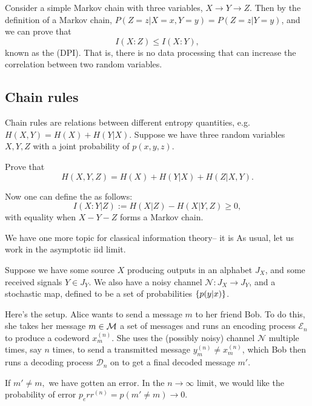 Consider a simple Markov chain with three variables, $X\to Y \to Z$. Then by the definition of a Markov chain, $P(Z=z| X=x, Y=y) = P(Z=z| Y=y)$, and we can prove that
\begin{equation}
    I(X:Z) \leq I(X:Y),
\end{equation}
known as the  (DPI). That is, there is no data processing that can increase the correlation between two random variables.

\subsection*{Chain rules} Chain rules are relations between different entropy quantities, e.g. $H(X,Y)=H(X)+ H(Y|X)$. Suppose we have three random variables $X,Y,Z$ with a joint probability of $p(x,y,z)$.
\begin{ex}
    Prove that
    \begin{equation}
        H(X,Y,Z)=H(X) + H(Y|X) + H(Z|X,Y).
    \end{equation}
\end{ex}
\begin{defn}
    Now one can define the  as follows:
    \begin{equation}
        I(X:Y | Z) := H(X|Z) - H(X|Y,Z) \geq 0,
    \end{equation}
    with equality when $X-Y-Z$ forms a Markov chain.
\end{defn}

We have one more topic for classical information theory-- it is  As usual, let us work in the asymptotic iid limit.

Suppose we have some source $X$ producing outputs in an alphabet $J_X$, and some received signals $Y\in J_Y$. We also have a noisy channel $\mathcal{N}:J_X \to J_Y$, and a stochastic map, defined to be a set of probabilities $\{p(y|x)\}$.

Here's the setup. Alice wants to send a message $m$ to her friend Bob. To do this, she takes her message $m\in \mathcal{M}$ a set of messages and runs an encoding process $\mathcal{E}_n$ to produce a codeword $x^{(n)}_m$. She uses the (possibly noisy) channel $\mathcal{N}$ multiple times, say $n$ times, to send a transmitted message $y_m^{(n)}\neq x_m^{(n)}$, which Bob then runs a decoding process $\mathcal{D}_n$ on to get a final decoded message $m'$.

If $m'\neq m,$ we have gotten an error. In the $n\to \infty$ limit, we would like the probability of error $p_err^{(n)}=p(m'\neq m) \to 0$.

